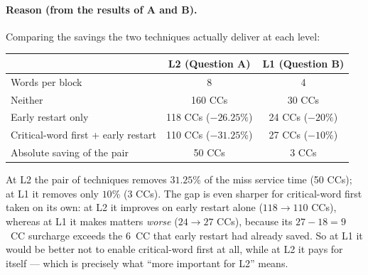 \paragraph{Reason (from the results of A and B).}
Comparing the savings the two techniques actually deliver at each level:
\begin{center}
\begin{tabular}{lcc}
\toprule
 & L2 (Question A) & L1 (Question B)\\
\midrule
Words per block                     & 8       & 4\\
Neither                             & 160 CCs & 30 CCs\\
Early restart only                  & 118 CCs \;($-26.25\%$) & 24 CCs \;($-20\%$)\\
Critical-word first + early restart & 110 CCs \;($-31.25\%$) & 27 CCs \;($-10\%$)\\
Absolute saving of the pair         & 50 CCs  & 3 CCs\\
\bottomrule
\end{tabular}
\end{center}
At L2 the pair of techniques removes $31.25\%$ of the miss service time (50 CCs); at L1
it removes only $10\%$ (3 CCs). The gap is even sharper for critical-word first taken on
its own: at L2 it improves on early restart alone ($118\to110$ CCs), whereas at L1 it
makes matters \emph{worse} ($24\to 27$ CCs), because its $27-18=9$~CC surcharge exceeds
the 6~CC that early restart had already saved. So at L1 it would be better not to enable
critical-word first at all, while at L2 it pays for itself --- which is precisely what
``more important for L2'' means.

